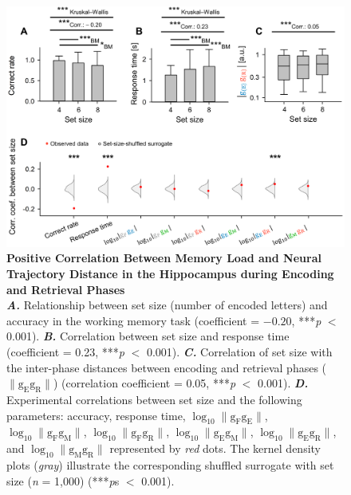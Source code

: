 \documentclass[final,3p,times,twocolumn]{elsarticle}
\begin{document}
        \begin{figure}[ht]
        	\centering
            \includegraphics[width=1\textwidth]{./src/figures/.png/Figure_ID_03.png}
        	\caption{\textbf{
Positive Correlation Between Memory Load and Neural Trajectory Distance in the Hippocampus during Encoding and Retrieval Phases
}
\smallskip
\\
\textbf{\textit{A.}} Relationship between set size (number of encoded letters) and accuracy in the working memory task (coefficient = $-0.20$, ***\textit{p} $<$ 0.001). \textbf{\textit{B.}} Correlation between set size and response time (coefficient = 0.23, ***\textit{p} $<$ 0.001). \textbf{\textit{C.}} Correlation of set size with the inter-phase distances between encoding and retrieval phases ($\lVert \mathrm{g_{E}g_{R}} \rVert$) (correlation coefficient = 0.05, ***\textit{p} $<$ 0.001). \textbf{\textit{D.}} Experimental correlations between set size and the following parameters: accuracy, response time, $\log_{10}{\lVert \mathrm{g_{F}g_{E}} \rVert}$, $\log_{10}{\lVert \mathrm{g_{F}g_{M}} \rVert}$, $\log_{10}{\lVert \mathrm{g_{F}g_{R}} \rVert}$, $\log_{10}{\lVert \mathrm{g_{E}g_{M}} \rVert}$, $\log_{10}{\lVert \mathrm{g_{E}g_{R}} \rVert}$, and $\log_{10}{\lVert \mathrm{g_{M}g_{R}} \rVert}$ represented by \textit{red} dots. The kernel density plots (\textit{gray}) illustrate the corresponding shuffled surrogate with set size (\textit{n} = 1,000) (***\textit{p}s $<$ 0.001).
}
        	\label{fig:03}
        \end{figure}
        \clearpage
\end{document}

